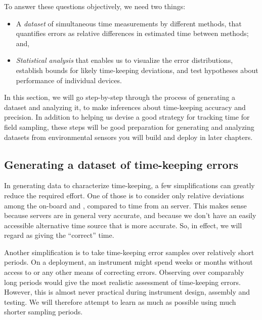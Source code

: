 To answer these questions objectively, we need two things:
\begin{itemize}
	\item A \emph{dataset} of simultaneous time measurements by different methods, that quantifies errors as relative differences in estimated time between methods; and,
	\item \emph{Statistical analysis} that enables us to visualize the error distributions, establish bounds for likely time-keeping deviations, and test hypotheses about performance of individual devices.
\end{itemize}
In this section, we will go step-by-step through the process of generating a dataset and analyzing it, to make inferences about time-keeping accuracy and precision. 
In addition to helping us devise a good strategy for tracking time for field sampling, these steps will be good preparation for generating and analyzing datasets from environmental sensors you will build and deploy in later chapters.


\subsection{Generating a dataset of time-keeping errors}
In generating data to characterize time-keeping, a few simplifications can greatly reduce the required effort. 
One of those is to consider only relative deviations among the on-board and  \rtcs, compared to time from an \ntp server. 
This makes sense because \ntp servers are in general very accurate, and because we don't have an easily accessible alternative time source that is more accurate.
So, in effect, we will regard \ntp as giving the ``correct'' time.

Another simplification is to take time-keeping error samples over relatively short periods. 
On a deployment, an instrument might spend weeks or months without access to \ntp or any other means of correcting errors. 
Observing \rtcs over comparably long periods would give the most realistic assessment of time-keeping errors.
However, this is almost never practical during instrument design, assembly and testing.
We will therefore attempt to learn as much as possible using much shorter sampling periods.

